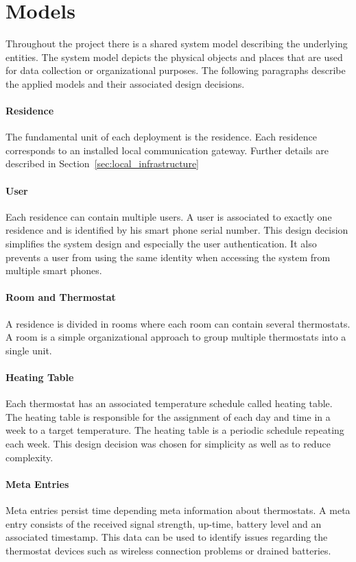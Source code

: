 \section{Models}
\label{sec:system_overview_models}

Throughout the project there is a shared system model describing the underlying entities. The system model depicts the physical objects and places that are used for data collection or organizational purposes. The following paragraphs describe the applied models and their associated design decisions.

\paragraph{Residence}

The fundamental unit of each deployment is the residence. Each residence corresponds to an installed local communication gateway. Further details are described in Section~\ref{sec:local_infrastructure}

\paragraph{User}

Each residence can contain multiple users. A user is associated to exactly one residence and is identified by his smart phone serial number. This design decision simplifies the system design and especially the user authentication. It also prevents a user from using the same identity when accessing the system from multiple smart phones.

\paragraph{Room and Thermostat}
A residence is divided in rooms where each room can contain several thermostats. A room is a simple organizational approach to group multiple thermostats into a single unit.

\paragraph{Heating Table}

Each thermostat has an associated temperature schedule called heating table. The heating table is responsible for the assignment of each day and time in a week to a target temperature. The heating table is a periodic schedule repeating each week. This design decision was chosen for simplicity as well as to reduce complexity.

\paragraph{Meta Entries}

Meta entries persist time depending meta information about thermostats. A meta entry consists of the received signal strength, up-time, battery level and an associated timestamp. This data can be used to identify issues regarding the thermostat devices such as wireless connection problems or drained batteries.
